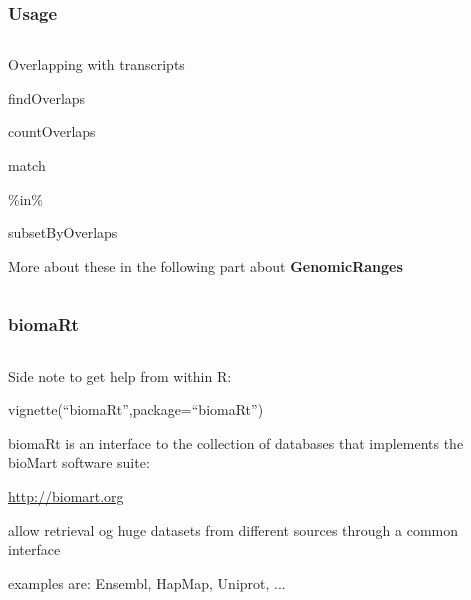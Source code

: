 \documentclass{beamer}
\begin{document}

\begin{frame}
\frametitle{Usage}
\begin{column}{1\textwidth}
  \bit
      \item Overlapping with transcripts
        \bit
            \item findOverlaps
            \item countOverlaps
            \item match
            \item \%in\%
            \item subsetByOverlaps
        \eit
      \item More about these in the following part about \textbf{GenomicRanges}
  \eit
\end{column}
\end{frame}


\begin{frame}
\frametitle{biomaRt}
\begin{column}{1\textwidth}
  \bit
      \item Side note to get help from within R:
        \bit
            \item vignette(``biomaRt'',package=``biomaRt'')
        \eit
      \item biomaRt is an interface to the collection of databases that implements the bioMart software suite:
        \bit
            \item \url{http://biomart.org}
            \item allow retrieval og huge datasets from different sources through a common interface
            \item examples are: Ensembl, HapMap, Uniprot, ...
        \eit        
  \eit
\end{column}
\end{frame}

\end{document}
